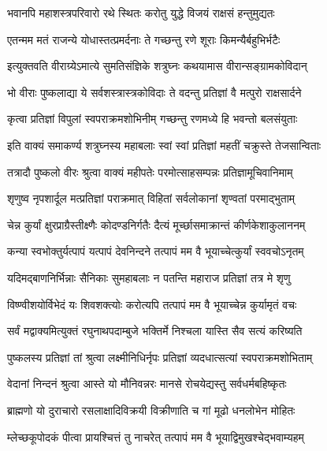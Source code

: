 \twolineshloka
{भवानपि महाशस्त्रपरिवारो रथे स्थितः}
{करोतु युद्धे विजयं राक्षसं हन्तुमुद्यतः}%

\twolineshloka
{एतन्मम मतं राजन्ये योधास्तत्प्रमर्दनाः}
{ते गच्छन्तु रणे शूराः किमन्यैर्बहुभिर्भटैः}%

\twolineshloka
{इत्युक्तवति वीराग्र्येऽमात्ये सुमतिसंज्ञिके}
{शत्रुघ्नः कथयामास वीरान्सङ्ग्रामकोविदान्}%

\twolineshloka
{भो वीराः पुष्कलाद्या ये सर्वशस्त्रास्त्रकोविदाः}
{ते वदन्तु प्रतिज्ञां वै मत्पुरो राक्षसार्दने}%

\twolineshloka
{कृत्वा प्रतिज्ञां विपुलां स्वपराक्रमशोभिनीम्}
{गच्छन्तु रणमध्ये हि भवन्तो बलसंयुताः}%

\twolineshloka
{इति वाक्यं समाकर्ण्य शत्रुघ्नस्य महाबलाः}
{स्वां स्वां प्रतिज्ञां महतीं चक्रुस्ते तेजसान्विताः}%

\twolineshloka
{तत्रादौ पुष्कलो वीरः श्रुत्वा वाक्यं महीपतेः}
{परमोत्साहसम्पन्नः प्रतिज्ञामूचिवानिमाम्}%


\twolineshloka
{शृणुष्व नृपशार्दूल मत्प्रतिज्ञां पराक्रमात्}
{विहितां सर्वलोकानां शृण्वतां परमाद्भुताम्}%

\twolineshloka
{चेन्न कुर्यां क्षुरप्राग्रैस्तीक्ष्णैः कोदण्डनिर्गतैः}
{दैत्यं मूर्च्छासमाक्रान्तं कीर्णकेशाकुलाननम्}%

\twolineshloka
{कन्या स्वभोक्तुर्यत्पापं यत्पापं देवनिन्दने}
{तत्पापं मम वै भूयाच्चेत्कुर्यां स्ववचोऽनृतम्}%

\twolineshloka
{यदिमद्बाणनिर्भिन्नाः सैनिकाः सुमहाबलाः}
{न पतन्ति महाराज प्रतिज्ञां तत्र मे शृणु}%

\twolineshloka
{विष्ण्वीशयोर्विभेदं यः शिवशक्त्योः करोत्यपि}
{तत्पापं मम वै भूयाच्चेन्न कुर्यामृतं वचः}%

\twolineshloka
{सर्वं मद्वाक्यमित्युक्तं रघुनाथपदाम्बुजे}
{भक्तिर्मे निश्चला यास्ति सैव सत्यं करिष्यति}%

\twolineshloka
{पुष्कलस्य प्रतिज्ञां तां श्रुत्वा लक्ष्मीनिधिर्नृपः}
{प्रतिज्ञां व्यदधात्सत्यां स्वपराक्रमशोभिताम्}%


\twolineshloka
{वेदानां निन्दनं श्रुत्वा आस्ते यो मौनिवन्नरः}
{मानसे रोचयेद्यस्तु सर्वधर्मबहिष्कृतः}%

\twolineshloka
{ब्राह्मणो यो दुराचारो रसलाक्षादिविक्रयी}
{विक्रीणाति च गां मूढो धनलोभेन मोहितः}%

\twolineshloka
{म्लेच्छकूपोदकं पीत्वा प्रायश्चित्तं तु नाचरेत्}
{तत्पापं मम वै भूयाद्विमुखश्चेद्भवाम्यहम्}%

